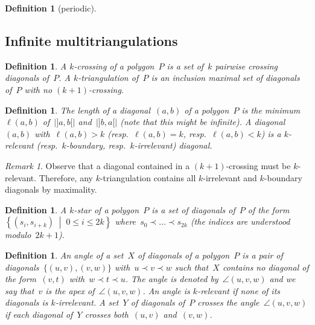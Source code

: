 \documentclass{amsart}
\newtheorem{definition}[theorem]{Definition}
\theoremstyle{remark}
\newtheorem{remark}{Remark}[section]
\newcommand{\darkblue}{\color{darkblue}} %
\newcommand{\defn}[1]{\textsl{\darkblue #1}} %
\newcommand*{\ktg}[0]{$k$-triangulation\xspace}
\newcommand{\cl}{\prec}
\newcommand{\set}[2]{\left\{ #1 \;\middle|\; #2 \right\}} %
\begin{document}
\begin{definition}[periodic]

\end{definition}

\subsection{Infinite multitriangulations}

\begin{definition}
A \defn{$k$-crossing} of a polygon~$P$ is a set of~$k$ pairwise crossing diagonals of~$P$.
A \defn{$k$-triangulation} of~$P$ is an inclusion maximal set of diagonals of~$P$ with no $(k+1)$-crossing.
\end{definition}

\begin{definition}
The \defn{length} of a diagonal~$(a,b)$ of a polygon~$P$ is the minimum~$\ell(a,b)$ of~$|{]a,b[}|$ and~$|{]b,a[}|$ (note that this might be infinite).
A diagonal~$(a,b)$ with~$\ell(a,b) > k$ (resp.~$\ell(a,b) = k$, resp.~$\ell(a,b) < k$) is a \defn{$k$-relevant} (resp.~\defn{$k$-boundary}, resp.~\defn{$k$-irrelevant}) diagonal.
\end{definition}

\begin{remark}
Observe that a diagonal contained in a $(k+1)$-crossing must be $k$-relevant.
Therefore, any \ktg contains all $k$-irrelevant and $k$-boundary diagonals by maximality.
\end{remark}


\begin{definition}
A \defn{$k$-star} of a polygon~$P$ is a set of diagonals of~$P$ of the form~$\set{(s_i, s_{i+k})}{0 \le i \le 2k}$ where~$s_0 \cl \dots \cl s_{2k}$ (the indices are understood modulo~$2k+1$).
\end{definition}

\begin{definition}
An \defn{angle} of a set~$X$ of diagonals of a polygon~$P$ is a pair of diagonals~$\{(u,v), (v,w)\}$ with~$u \cl v \cl w$ such that~$X$ contains no diagonal of the form~$(v,t)$ with~$w \cl t \cl u$. The angle is denoted by~$\angle(u,v,w)$ and we say that~$v$ is the \defn{apex} of~$\angle(u,v,w)$. An angle is \defn{$k$-relevant} if none of its diagonals is $k$-irrelevant. A set~$Y$ of diagonals of~$P$ crosses the angle~$\angle(u,v,w)$ if each diagonal of~$Y$ crosses both~$(u,v)$ and~$(v,w)$.
\end{definition}
\end{document}
